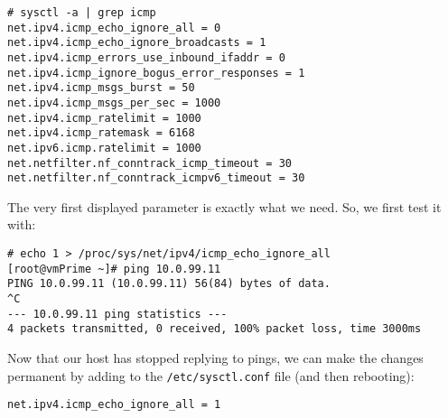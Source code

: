 \vspace{-15pt}
\begin{verbatim}
# sysctl -a | grep icmp
net.ipv4.icmp_echo_ignore_all = 0
net.ipv4.icmp_echo_ignore_broadcasts = 1
net.ipv4.icmp_errors_use_inbound_ifaddr = 0
net.ipv4.icmp_ignore_bogus_error_responses = 1
net.ipv4.icmp_msgs_burst = 50
net.ipv4.icmp_msgs_per_sec = 1000
net.ipv4.icmp_ratelimit = 1000
net.ipv4.icmp_ratemask = 6168
net.ipv6.icmp.ratelimit = 1000
net.netfilter.nf_conntrack_icmp_timeout = 30
net.netfilter.nf_conntrack_icmpv6_timeout = 30
\end{verbatim}
\vspace{-10pt}	

\noindent
The very first displayed parameter is exactly what we need. So, we first test it with: 

\vspace{-15pt}
\begin{verbatim}
# echo 1 > /proc/sys/net/ipv4/icmp_echo_ignore_all 
[root@vmPrime ~]# ping 10.0.99.11
PING 10.0.99.11 (10.0.99.11) 56(84) bytes of data.
^C
--- 10.0.99.11 ping statistics ---
4 packets transmitted, 0 received, 100% packet loss, time 3000ms
\end{verbatim}
\vspace{-10pt}	

\noindent
Now that our host has stopped replying to pings, we can make the changes permanent by adding to the \verb|/etc/sysctl.conf| file (and then rebooting):

\vspace{-15pt}
\begin{verbatim}
net.ipv4.icmp_echo_ignore_all = 1
\end{verbatim}